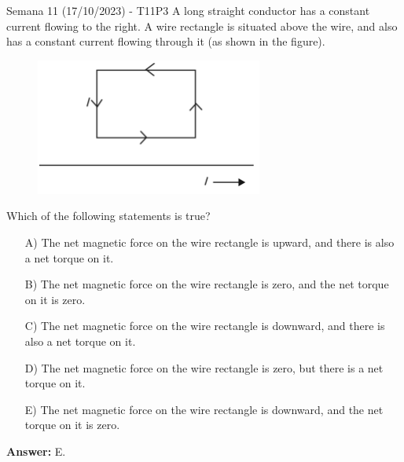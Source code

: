 \begin{frame}{Semana 11 (17/10/2023) - T11P3}
    \footnotesize
    A long straight conductor has a constant current flowing to the right. A wire rectangle is situated above the wire, and also has a constant current flowing through it (as shown in the figure).
    
    \begin{figure}
        \centering
        \includegraphics[scale=0.4]{figures/t9p3.png}
    \end{figure}
    Which of the following statements is true?
    
    
    \begin{itemize}
        \item[A)] The net magnetic force on the wire rectangle is upward, and there is also a net torque on it.
        \item[B)] The net magnetic force on the wire rectangle is zero, and the net torque on it is zero.
        \item[C)] The net magnetic force on the wire rectangle is downward, and there is also a net torque on it.
        \item[D)] The net magnetic force on the wire rectangle is zero, but there is a net torque on it.
        \item[E)] The net magnetic force on the wire rectangle is downward, and the net torque on it is zero.
    \end{itemize}
    
     \pause \centering \textbf{Answer:} E.
    
\end{frame}


